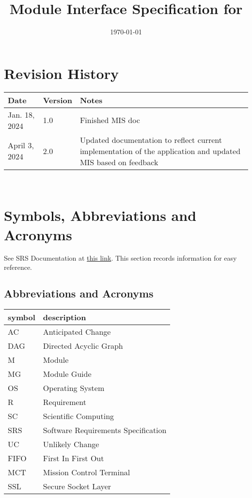 \documentclass[12pt, titlepage]{article}
\begin{document}
\title{Module Interface Specification for }

\author{\authname}

\date{\today}

\maketitle


\section{Revision History}

\begin{tabularx}{\textwidth}{p{3cm}p{2cm}X}
\toprule {\bf Date} & {\bf Version} & {\bf Notes}\\
\midrule
Jan. 18, 2024 & 1.0 & Finished MIS doc\\
April 3, 2024 & 2.0 & Updated documentation to reflect current implementation of the application and updated MIS based on feedback\\
\bottomrule
\end{tabularx}

~\newpage

\section{Symbols, Abbreviations and Acronyms}

See SRS Documentation at \href{https://github.com/LowerEarthOrbiters/Lower_Earth_Orbiters/tree/main/docs/SRS}{this link}. This section records information for easy reference.

\subsection{Abbreviations and Acronyms}

\renewcommand{\arraystretch}{1.2}
\begin{tabular}{l l} 
  \toprule		
  \textbf{symbol} & \textbf{description}\\
  \midrule 
  AC & Anticipated Change\\
  DAG & Directed Acyclic Graph \\
  M & Module \\
  MG & Module Guide \\
  OS & Operating System \\
  R & Requirement\\
  SC & Scientific Computing \\
  SRS & Software Requirements Specification\\
  UC & Unlikely Change \\
  FIFO & First In First Out \\
  MCT & Mission Control Terminal \\
  SSL & Secure Socket Layer \\
  \bottomrule
\end{tabular}\\
\end{document}
